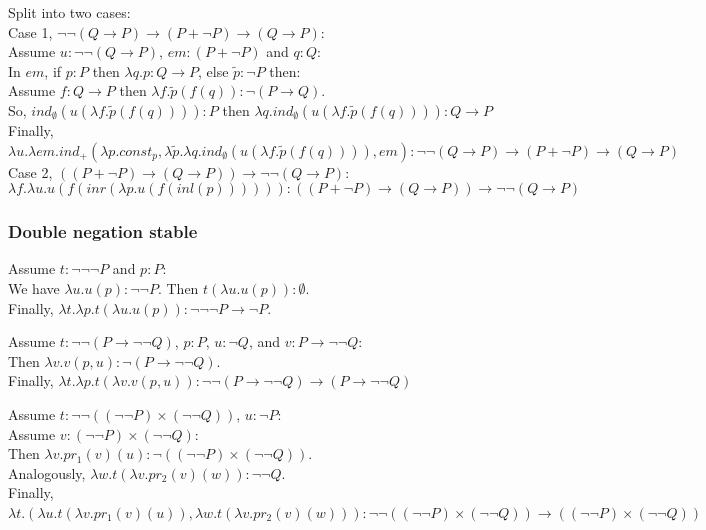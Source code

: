 \documentclass{article}
\begin{document}
\par\vspace{1em}
Split into two cases:\\
Case 1, $\lnot\lnot(Q \to P) \to (P + \lnot P) \to (Q \to P)$:\\
Assume $u:\lnot\lnot(Q \to P)$, $em:(P + \lnot P)$ and $q:Q$:\\
In $em$, if $p:P$ then $\lambda q.p:Q \to P$, else $\tilde{p}:\lnot P$ then:\\
Assume $f:Q \to P$ then $\lambda f.\tilde{p}(f(q)):\lnot(P \to Q)$.\\
So, $ind_\emptyset(u(\lambda f.\tilde{p}(f(q)))):P$ then $\lambda q.ind_\emptyset(u(\lambda f.\tilde{p}(f(q)))):Q \to P$\\
Finally, $\lambda u.\lambda em.ind_+(\lambda p.const_p,\lambda \tilde{p}.\lambda q.ind_\emptyset(u(\lambda f.\tilde{p}(f(q)))),em):\lnot\lnot(Q \to P) \to (P + \lnot P) \to (Q \to P)$\\
Case 2, $((P + \lnot P) \to (Q \to P)) \to \lnot\lnot(Q \to P)$:
$$
    \lambda f.\lambda u.u(f(inr(\lambda p.u(f(inl(p)))))):((P + \lnot P) \to (Q \to P)) \to \lnot\lnot(Q \to P)
$$
\subsubsection{Double negation stable}
\par
Assume $t:\lnot\lnot\lnot P$ and $p:P$:\\
We have $\lambda u.u(p):\lnot\lnot P$. Then $t(\lambda u.u(p)):\emptyset$.\\
Finally, $\lambda t.\lambda p.t(\lambda u.u(p)):\lnot\lnot\lnot P \to \lnot P.$

\vspace{1em}\par
Assume $t:\lnot\lnot(P \to \lnot\lnot Q)$, $p:P$, $u:\lnot Q$, and $v:P \to \lnot\lnot Q$:\\
Then $\lambda v.v(p, u):\lnot(P \to \lnot\lnot Q)$.\\
Finally, $\lambda t.\lambda p.t(\lambda v.v(p, u)):\lnot\lnot (P \to \lnot\lnot Q) \to (P \to \lnot\lnot Q)$

\vspace{1em}\par
Assume $t:\lnot\lnot((\lnot\lnot P) \times (\lnot\lnot Q))$, $u:\lnot P$:\\
Assume $v:(\lnot\lnot P) \times (\lnot\lnot Q)$:\\
Then $\lambda v.pr_1(v)(u):\lnot((\lnot\lnot P) \times (\lnot\lnot Q))$.\\
Analogously, $\lambda w.t(\lambda v.pr_2(v)(w)):\lnot\lnot Q$.\\
Finally, $\lambda t.(\lambda u.t(\lambda v.pr_1(v)(u)),\lambda w.t(\lambda v.pr_2(v)(w))):\lnot\lnot((\lnot\lnot P) \times (\lnot\lnot Q)) \to ((\lnot\lnot P) \times (\lnot\lnot Q))$
\end{document}
